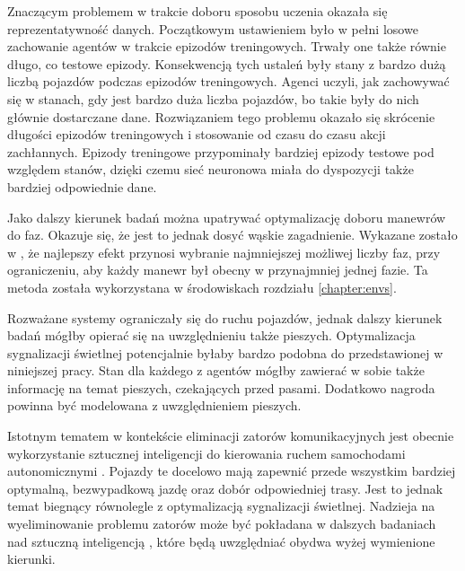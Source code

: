 \documentclass[12pt]{book}
\theoremstyle{plain}
\begin{document}
Znaczącym problemem w trakcie doboru sposobu uczenia okazała się reprezentatywność danych. Początkowym ustawieniem było w pełni losowe zachowanie agentów w trakcie epizodów treningowych. Trwały one także równie długo, co testowe epizody. Konsekwencją tych ustaleń były stany z bardzo dużą liczbą pojazdów podczas epizodów treningowych. Agenci uczyli, jak zachowywać się w stanach,  gdy jest bardzo duża liczba pojazdów, bo takie były do nich głównie dostarczane dane. Rozwiązaniem tego problemu okazało się skrócenie długości epizodów treningowych i stosowanie od czasu do czasu akcji zachłannych. Epizody treningowe przypominały bardziej epizody testowe pod względem stanów, dzięki czemu sieć neuronowa miała do dyspozycji także bardziej odpowiednie dane.

Jako dalszy kierunek badań można upatrywać optymalizację doboru manewrów do faz.
Okazuje się, że jest to jednak dosyć wąskie zagadnienie.   Wykazane zostało w \cite{gottlich}, że najlepszy efekt przynosi wybranie najmniejszej możliwej liczby faz,  przy ograniczeniu, aby każdy manewr był obecny w przynajmniej jednej fazie. Ta metoda została wykorzystana w środowiskach rozdziału \ref{chapter:envs}.

Rozważane systemy ograniczały się do  ruchu pojazdów, jednak dalszy kierunek badań mógłby opierać się na uwzględnieniu także pieszych. Optymalizacja sygnalizacji świetlnej potencjalnie byłaby bardzo podobna do przedstawionej w niniejszej pracy. Stan dla każdego z agentów mógłby zawierać w sobie także informację na temat pieszych, czekających przed pasami. Dodatkowo nagroda powinna być modelowana z uwzględnieniem pieszych. 

Istotnym  tematem w kontekście eliminacji zatorów komunikacyjnych jest  obecnie  wykorzystanie sztucznej inteligencji  do kierowania ruchem  samochodami autonomicznymi .  Pojazdy te docelowo mają zapewnić przede wszystkim bardziej optymalną, bezwypadkową jazdę oraz dobór odpowiedniej trasy. Jest to jednak temat biegnący równolegle z optymalizacją sygnalizacji świetlnej.  Nadzieja na wyeliminowanie problemu zatorów może być pokładana w  dalszych badaniach nad sztuczną inteligencją ,  które będą uwzględniać obydwa wyżej wymienione kierunki.





\end{document}
